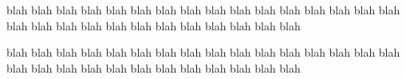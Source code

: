 \documentclass[11pt]{article}
\begin{document}

% 

% 

% 

% 
% 
% 
% 
% 
% 

blah blah blah blah blah blah blah blah blah blah blah blah blah blah blah blah blah blah blah blah blah blah blah blah blah blah blah blah 

% 

blah blah blah blah blah blah blah blah blah blah blah blah blah blah blah blah blah blah blah blah blah blah blah blah blah blah blah blah 
\end{document}
